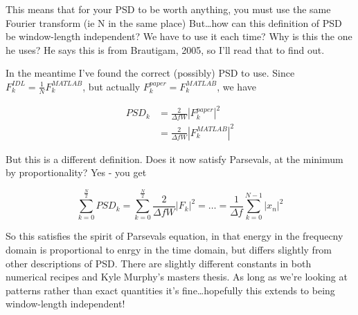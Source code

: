 \documentclass[11pt]{article}
\begin{document}
This means that for your PSD to be worth anything, you must use the same Fourier transform (ie N in
the same place) But\ldots how can this definition of PSD be window-length independent? We have to
use it each time? Why is this the one he uses? He says this is from Brautigam, 2005, so I'll
read that to find out.

In the meantime I've found the correct (possibly) PSD to use. Since $F_k^{IDL} = \frac{1}{N}
F_k^{MATLAB}$, but actually $F_k^{paper} = F_k^{MATLAB}$, we have 

\begin{align}
    PSD_k &=\frac{2}{\Delta f W} \left| F_k^{paper} \right|^2 \\
    &= \frac{2}{\Delta f W} \left| F_k^{MATLAB} \right|^2
\end{align}

But this is a different definition. Does it now satisfy Parsevals, at the minimum by
proportionality? Yes - you get

\begin{equation}
    \sum_{k=0}^{\frac{N}{2}} PSD_k = \sum_{k=0}^{\frac{N}{2}} \frac{2}{\Delta f W}
    \left| F_k \right|^2 = \ldots = \frac{1}{\Delta f} \sum_{k=0}^{N-1} \left| x_n \right|^2
\end{equation}

So this satisfies the spirit of Parsevals equation, in that energy in the frequecny domain is
proportional to enrgy in the time domain, but differs slightly from other descriptions of PSD.
There are slightly different constants in both numerical recipes and Kyle Murphy's masters thesis.
As long as we're looking at patterns rather than exact quantities it's fine\ldots hopefully
this extends to being window-length independent!
\end{document}
